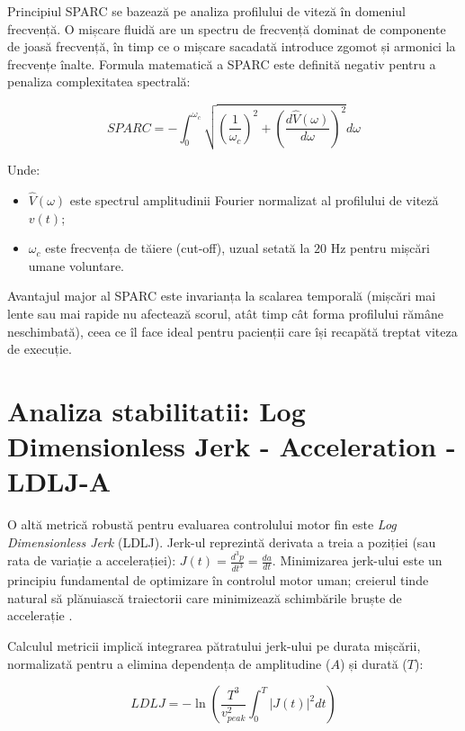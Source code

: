 Principiul SPARC se bazează pe analiza profilului de viteză în domeniul frecvență. O mișcare fluidă are un spectru de frecvență dominat de componente de joasă frecvență, în timp ce o mișcare sacadată introduce zgomot și armonici la frecvențe înalte.
Formula matematică a SPARC este definită negativ pentru a penaliza complexitatea spectrală:

\begin{equation}
SPARC = -\int_{0}^{\omega_c} \sqrt{\left(\frac{1}{\omega_c}\right)^2 + \left(\frac{d\hat{V}(\omega)}{d\omega}\right)^2} d\omega
\end{equation}

Unde:
\begin{itemize}
    \item $\hat{V}(\omega)$ este spectrul amplitudinii Fourier normalizat al profilului de viteză $v(t)$;
    \item $\omega_c$ este frecvența de tăiere (cut-off), uzual setată la $20 \text{ Hz}$ pentru mișcări umane voluntare.
\end{itemize}

Avantajul major al SPARC este invarianța la scalarea temporală (mișcări mai lente sau mai rapide nu afectează scorul, atât timp cât forma profilului rămâne neschimbată), ceea ce îl face ideal pentru pacienții care își recapătă treptat viteza de execuție.

\section{Analiza stabilitatii: Log Dimensionless Jerk - Acceleration - LDLJ-A}
\hspace{0.75cm}O altă metrică robustă pentru evaluarea controlului motor fin este \textit{Log Dimensionless Jerk} (LDLJ). Jerk-ul reprezintă derivata a treia a poziției (sau rata de variație a accelerației): $J(t) = \frac{d^3p}{dt^3} = \frac{da}{dt}$.
Minimizarea jerk-ului este un principiu fundamental de optimizare în controlul motor uman; creierul tinde natural să plănuiască traiectorii care minimizează schimbările bruște de accelerație \cite{hogan_stergiou_2015}.

Calculul metricii implică integrarea pătratului jerk-ului pe durata mișcării, normalizată pentru a elimina dependența de amplitudine ($A$) și durată ($T$):

\begin{equation}
LDLJ = -\ln \left( \frac{T^3}{v_{peak}^2} \int_{0}^{T} |J(t)|^2 dt \right)
\end{equation}

